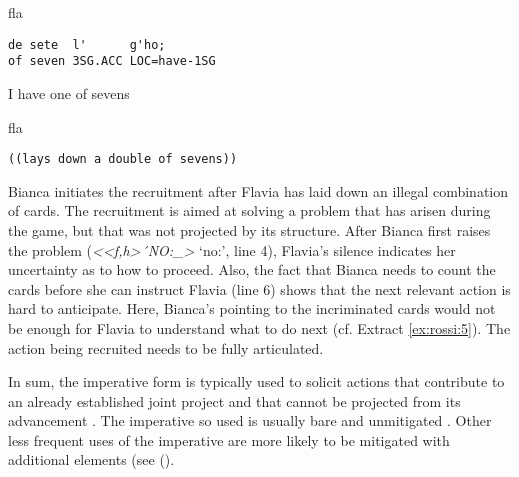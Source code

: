 \documentclass[output=paper,modfonts]{langscibook}
\begin{document}
%
%
\begin{transbox}{10}{fla}
\begin{verbatim}
de sete  l'      g'ho;
of seven 3SG.ACC LOC=have-1SG
\end{verbatim}
I have one of sevens
\end{transbox}\vspace{3mm}
%
\vspace{-1mm}
%
\begin{mdframednoverticalspace}[style=secondfoc]
\begin{transbox}{11}{fla}
\begin{verbatim}
((lays down a double of sevens))
\end{verbatim}
\end{transbox}
\end{mdframednoverticalspace}

Bianca initiates the recruitment after Flavia has laid down an illegal combination of cards. The recruitment is aimed at solving a problem that has arisen during the game, but that was not projected by its structure. After Bianca first raises the problem (\textit{<{}<f,h>´{}NO:\_>} ‘no:’, line 4), Flavia's silence indicates her uncertainty as to how to proceed. Also, the fact that Bianca needs to count the cards before she can instruct Flavia (line 6) shows that the next relevant action is hard to anticipate. Here, Bianca's pointing to the incriminated cards would not be enough for Flavia to understand what to do next (cf. Extract \ref{ex:rossi:5}). The action being recruited needs to be fully articulated.

In sum, the imperative form is typically used to solicit actions that contribute to an already established joint project and that cannot be projected from its advancement \citep{Rossi2012,Rossi2014}. The imperative so used is usually bare and unmitigated \citep{Rossi2017}. Other less frequent uses of the imperative are more likely to be mitigated with additional elements (see ().
\end{document}
